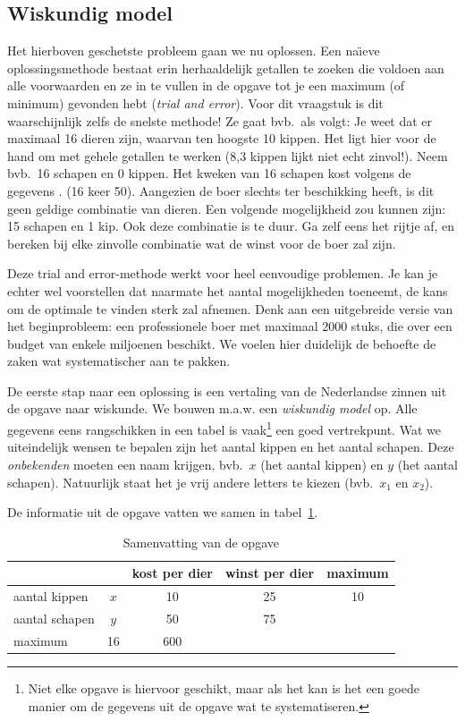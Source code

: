 \subsection{Wiskundig model}

Het hierboven geschetste probleem gaan we nu oplossen.
Een na\"{\i}eve oplossingsmethode bestaat erin herhaaldelijk getallen
te zoeken die voldoen aan alle voorwaarden en ze in te vullen
in de opgave tot je een maximum (of minimum) gevonden hebt (\textit{trial
and error}). Voor dit vraagstuk is dit waarschijnlijk zelfs de
snelste methode! Ze gaat bvb.\ als volgt: Je weet dat er maximaal
16 dieren zijn, waarvan ten hoogste 10 kippen. Het ligt hier
voor de hand om met gehele getallen te werken (8,3 kippen lijkt
niet echt zinvol!). Neem bvb.\ 16 schapen en 0 kippen. Het kweken
van 16 schapen kost volgens de gegevens . (16 keer 50).
Aangezien de boer slechts  ter beschikking heeft, is
dit geen geldige combinatie van dieren. Een volgende mogelijkheid
zou kunnen zijn: 15 schapen en 1 kip. Ook deze combinatie is
te duur. Ga zelf eens het rijtje af, en bereken bij elke zinvolle
combinatie wat de winst voor de boer zal zijn.


Deze trial and error-methode werkt voor heel eenvoudige problemen.
Je kan je echter wel voorstellen dat naarmate het aantal mogelijkheden
toeneemt, de kans om de optimale te vinden sterk zal afnemen.
Denk aan een uitgebreide versie van het beginprobleem: een professionele
boer met maximaal 2000 stuks, die over een budget van enkele
miljoenen beschikt. We voelen hier duidelijk de behoefte de zaken
wat systematischer aan te pakken.

De eerste stap naar een oplossing is een vertaling van de Nederlandse
zinnen uit de opgave naar wiskunde. We bouwen m.a.w. een \textit{wiskundig
model} op. Alle gegevens eens rangschikken in een tabel is
vaak\footnote{Niet elke opgave is hiervoor geschikt, maar als het kan
is het een goede manier om de gegevens uit de opgave wat te
systematiseren.}
een goed vertrekpunt. Wat we uiteindelijk wensen te bepalen zijn
het aantal kippen en het aantal schapen. Deze \textit{onbekenden}
moeten een naam krijgen, bvb.\ $x$ (het aantal kippen) en $y$
(het aantal schapen). Natuurlijk staat het je vrij andere letters
te kiezen (bvb.\ $x_{1}$ en $x_{2}$).

De informatie uit de opgave vatten we samen in tabel~\ref{tbl:opg1}.
\begin{table}[htbp]
    \centering
    \caption{Samenvatting van de opgave}
    \begin{tabular}{lcccc}
        \toprule
         & & kost per dier & winst per dier & maximum \\
        \midrule
        aantal kippen & $x$ & 10 & 25 & 10  \\
        aantal schapen & $y$ & 50 & 75 &  \\
        \cmidrule{2-3}
        maximum & 16  & 600 & &  \\
    \bottomrule
    \end{tabular}
    \label{tbl:opg1}
\end{table}

